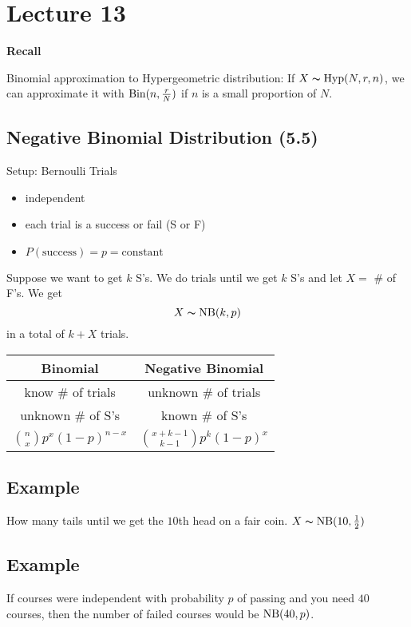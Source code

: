 \section{Lecture 13}
\textbf{Recall}

Binomial approximation to Hypergeometric distribution:
If $ X\thicksim\operatorname{Hyp} (N,r,n) $, we can approximate it with 
$ \operatorname{Bin} (n,\frac{r}{N}) $ if $ n $ is a small proportion of $ N $.

\subsection{Negative Binomial Distribution (5.5)}
Setup: Bernoulli Trials
\begin{itemize}
    \item independent
    \item each trial is a success or fail (S or F)
    \item $ P(\text{success})=p=\text{constant} $ 
\end{itemize}
Suppose we want to get $ k $ S's. We do trials until we get
$ k $ S's and let $ X= $ \# of F's. We get
\[ X\thicksim \operatorname{NB}(k,p) \]
in a total of $ k+X $ trials.


\begin{center}
    \begin{tabular}{|c|c|}
        \hline
        Binomial & Negative Binomial \\
        \hline
        know \# of trials & unknown \# of trials\\
        unknown \# of S's & known \# of S's\\
        $ \binom{n}{x}p^x(1-p)^{n-x} $ & 
        $ \binom{x+k-1}{k-1}p^k(1-p)^x $\\
        \hline
    \end{tabular}
\end{center}

\subsection{Example}
How many tails until we get the $10$th head on a fair coin.
$ X\thicksim\operatorname{NB}(10,\frac{1}{2}) $

\subsection{Example}
If courses were independent with probability $ p $ of passing
and you need $ 40 $ courses, then the number of failed courses
would be $ \operatorname{NB}(40,p) $.


